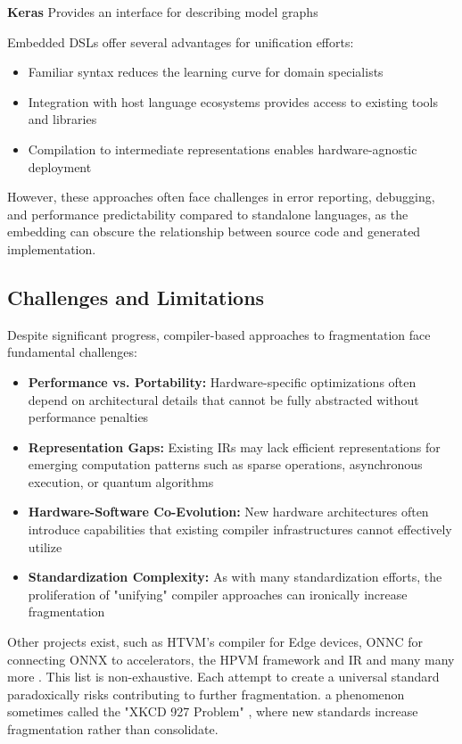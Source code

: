 \documentclass[manuscript,screen,review,format=acmsmall]{acmart}
\begin{document}
\textbf{Keras} Provides an interface for describing model graphs

Embedded DSLs offer several advantages for unification efforts:
\begin{itemize}
    \item Familiar syntax reduces the learning curve for domain specialists
    \item Integration with host language ecosystems provides access to existing tools and libraries
    \item Compilation to intermediate representations enables hardware-agnostic deployment
\end{itemize}

However, these approaches often face challenges in error reporting, debugging, and performance predictability compared to standalone languages, as the embedding can obscure the relationship between source code and generated implementation.

\subsection{Challenges and Limitations}

Despite significant progress, compiler-based approaches to fragmentation face fundamental challenges:

\begin{itemize}
    \item \textbf{Performance vs. Portability:} Hardware-specific optimizations often depend on architectural details that cannot be fully abstracted without performance penalties
    
    \item \textbf{Representation Gaps:} Existing IRs may lack efficient representations for emerging computation patterns such as sparse operations, asynchronous execution, or quantum algorithms
    
    \item \textbf{Hardware-Software Co-Evolution:} New hardware architectures often introduce capabilities that existing compiler infrastructures cannot effectively utilize
    
    \item \textbf{Standardization Complexity:} As with many standardization efforts, the proliferation of "unifying" compiler approaches can ironically increase fragmentation
\end{itemize}

Other projects exist, such as HTVM's \cite{JosseVanDelm2024HENN} compiler for Edge devices, ONNC \cite{ONNC} for connecting ONNX to accelerators, the HPVM framework and IR \cite{EjjehAdel2022HHPf} and many many more \cite{DeepLearningCompilerSurvey}. This list is non-exhaustive. Each attempt to create a universal standard paradoxically risks contributing to further fragmentation. a phenomenon sometimes called the "XKCD 927 Problem" \cite{xkcd}, where new standards increase fragmentation rather than consolidate.
\end{document}

